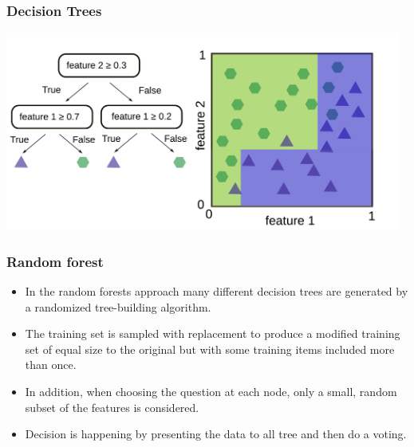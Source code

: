 \documentclass[aspectratio=169]{beamer}
\begin{document}
\begin{frame}
  \frametitle{Decision Trees}
  \begin{center}
    \includegraphics[width=13.0cm]{images/decision_tree_2.pdf}
  \end{center}  
\end{frame}


\begin{frame}
  \frametitle{Random forest}
  \begin{block}{}
    \begin{center}
      \begin{itemize}
      \item In the random forests approach many different decision
        trees are generated by a randomized tree-building algorithm.
      \item The training set is sampled with replacement to produce a
        modified training set of equal size to the original but with some
        training items included more than once.
      \item In addition, when choosing the question at each node, only a
        small, random subset of the features is considered.
      \item Decision is happening by presenting the data to all tree
        and then do a voting.
      \end{itemize}
    \end{center}
  \end{block}
\end{frame}
\end{document}
